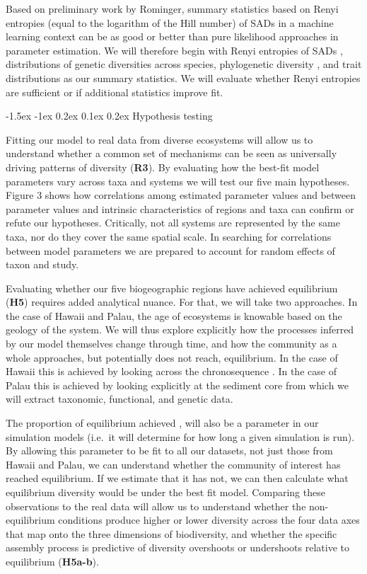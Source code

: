 \documentclass[11pt]{article}
\makeatletter
\renewcommand\subsubsection{\@startsection{subsection}{1}{\z@}%
                                  {-1.5ex \@plus -1ex \@minus 0.2ex}%
                                  {0.1ex \@plus 0.2ex}%
                                  {\normalfont\bfseries}}
\makeatother
\begin{document}
Based on preliminary work by Rominger, summary statistics based on Renyi
entropies (equal to the logarithm of the Hill number) of SADs in a
machine learning context can be as good or better than pure likelihood
approaches in parameter estimation. We will therefore begin with Renyi
entropies of SADs \cite{May2017-ji}, distributions of genetic
diversities across species, phylogenetic diversity \cite{Chao2010-oo},
and trait distributions as our summary statistics. We will evaluate
whether Renyi entropies are sufficient or if additional statistics
improve fit.

\subsubsection{Hypothesis testing}\label{hypothesis-testing}

Fitting our model to real data from diverse ecosystems will allow us
to understand whether a common set of mechanisms can be seen as
universally driving patterns of diversity (\textbf{R3}). By evaluating
how the best-fit model parameters vary across taxa and systems we will
test our five main hypotheses. Figure 3 shows how correlations among
estimated parameter values and between parameter values and intrinsic
characteristics of regions and taxa can confirm or refute our
hypotheses. Critically, not all systems are represented by the same
taxa, nor do they cover the same spatial scale. In searching for
correlations between model parameters we are prepared to
account for random effects of taxon and study.

Evaluating whether our five biogeographic regions have achieved
equilibrium (\textbf{H5}) requires added analytical nuance. For that,
we will take two approaches. In the case of Hawaii and Palau, the age
of ecosystems is knowable based on the geology of the system. We will
thus explore explicitly how the processes inferred by our model
themselves change through time, and how the community as a whole
approaches, but potentially does not reach, equilibrium. In the case
of Hawaii this is achieved by looking across the chronosequence
\cite{Rominger2015-kb}. In the case of Palau this is achieved by
looking explicitly at the sediment core from which we will extract
taxonomic, functional, and genetic data.

The proportion of equilibrium achieved
\citep[sensu][]{Rosindell2013-di}, will also be a parameter in our
simulation models (i.e.~it will determine for how long a given
simulation is run). By allowing this parameter to be fit to all our
datasets, not just those from Hawaii and Palau, we can understand
whether the community of interest has reached equilibrium. If we
estimate that it has not, we can then calculate what equilibrium
diversity would be under the best fit model. Comparing these
observations to the real data will allow us to understand whether the
non-equilibrium conditions produce higher or lower diversity across
the four data axes that map onto the three dimensions of biodiversity,
and whether the specific assembly process is predictive of diversity
overshoots or undershoots relative to equilibrium (\textbf{H5a-b}).
\end{document}
